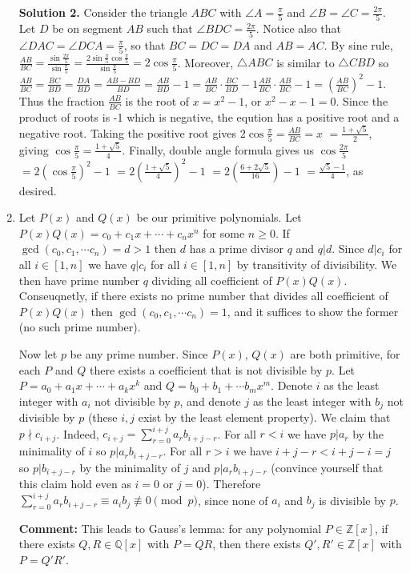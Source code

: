 \documentclass[11pt]{article}
\begin{document}
\begin{enumerate}
\textbf {Solution 2.} Consider the triangle $ABC$ with $\angle A=\frac{\pi}{5}$ and $\angle B=\angle C=\frac{2\pi}{5}$. Let $D$ be on segment $AB$ such that $\angle BDC=\frac{2\pi}{5}$. Notice also that $\angle DAC=\angle DCA=\frac{\pi}{5}$, so that $BC=DC=DA$ and $AB=AC$. By sine rule, $\frac{AB}{BC}=\frac{\sin \frac{2\pi}{5}}{\sin \frac{\pi}{5}}=\frac{2\sin \frac{\pi}{5}\cos\frac{\pi}{5}}{\sin \frac{\pi}{5}}=2\cos\frac{\pi}{5}$. Moreover, $\triangle ABC$ is similar to $\triangle CBD$ so $\frac{AB}{BC}=\frac{BC}{BD}=\frac{DA}{BD}=\frac{AB-BD}{BD}=\frac{AB}{BD}-1=\frac{AB}{BC}\cdot\frac{BC}{BD}-1
\frac{AB}{BC}\cdot\frac{AB}{BC}-1
=(\frac{AB}{BC})^2-1$.
Thus the fraction $\frac{AB}{BC}$ is the root of $x=x^2-1$, or $x^2-x-1=0$. Since the product of roots is -1 which is negative, the eqution has a positive root and a negative root. Taking the positive root gives 
$2\cos\frac{\pi}{5}=\frac{AB}{BC}=x$
$=\frac{1+\sqrt{5}}{2}$,
giving $\cos\frac{\pi}{5}=\frac{1+\sqrt{5}}{4}$.
Finally, double angle formula gives us $\cos\frac{2\pi}{5}$
$=2(\cos\frac{\pi}{5})^2-1$
$=2(\frac{1+\sqrt{5}}{4})^2-1$
$=2(\frac{6+2\sqrt{5}}{16})-1$
$=\frac{\sqrt{5}-1}{4}$, as desired.

\item Let $P(x)$ and $Q(x)$ be our primitive polynomials. Let $P(x)Q(x)=c_0+c_1x+\cdots +c_n x^n$ for some $n\ge 0$. If $\gcd (c_0, c_1, \cdots c_n)=d>1$ then $d$ has a prime divisor $q$ and $q|d$. Since $d|c_i$ for all $i\in [1,n]$ we have $q|c_i$ for all $i\in [1,n]$ by transitivity of divisibility. We then have prime number $q$ dividing all coefficient of $P(x)Q(x)$. Conseuqnetly, if there exists no prime number that divides all coefficient of $P(x)Q(x)$ then $\gcd (c_0, c_1, \cdots c_n)=1$, and it suffices to show the former (no such prime number).

Now let $p$ be any prime number. Since $P(x)$, $Q(x)$ are both primitive, for each $P$ and $Q$ there exists a coefficient that is not divisible by $p$. Let $P=a_0+a_1x+\cdots + a_kx^k$ and $Q=b_0+b_1+\cdots b_mx^m$. Denote $i$ as the least integer with $a_i$ not divisible by $p$, and denote $j$ as the least integer with $b_j$ not divisible by $p$ (these $i, j$ exist by the least element property). We claim that $p\nmid c_{i+j}$. Indeed, $c_{i+j}=\displaystyle\sum_{r=0}^{i+j} a_rb_{i+j-r}$. For all $r< i$ we have $p|a_r$ by the minimality of $i$ so $p|a_rb_{i+j-r}$. For all $r>i$ we have $i+j-r<i+j-i=j$ so $p|b_{i+j-r}$ by the minimality of $j$ and $p|a_rb_{i+j-r}$ (convince yourself that this claim hold even as $i=0$ or $j=0$). Therefore $\displaystyle\sum_{r=0}^{i+j} a_rb_{i+j-r}\equiv a_ib_j\not\equiv 0\pmod{p}$, since none of $a_i$ and $b_j$ is divisible by $p$.

\textbf{Comment:} This leads to Gauss's lemma: for any polynomial $P\in\mathbb{Z}[x]$, if there exists $Q,R\in\mathbb{Q}[x]$ with $P=QR$, then there exists $Q', R'\in\mathbb{Z}[x]$ with $P=Q'R'$.
\end{enumerate}
\end{document}
